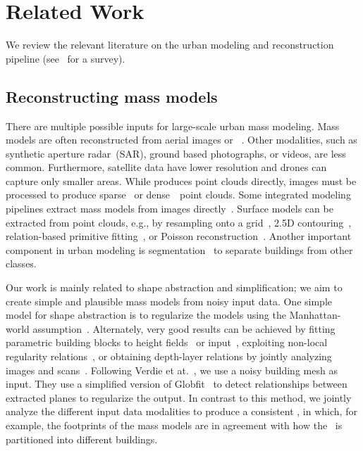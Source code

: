 
\section{Related Work}

We review the relevant literature on the urban modeling and reconstruction pipeline (see~\cite{musialski2013survey} for a  survey).

\subsection{Reconstructing mass models}
There are multiple possible inputs for large-scale urban mass modeling. Mass models are often reconstructed from aerial images or \lidar~\cite{brenner2005building}. Other modalities, such as synthetic aperture radar~(SAR), ground based photographs, or videos, are less common. Furthermore, satellite data have lower resolution and drones can capture only smaller areas.
While \lidar produces point clouds directly, images must be processed to produce sparse~\cite{snavely2006photo} or dense~\cite{furukawa2010accurate,cmzp_symmCalib_tog13}~point clouds. 
Some integrated modeling pipelines extract mass models from images directly~\cite{dick2004modelling,vanegas2010building,garcia2013automatic}. 
Surface models can be extracted from point clouds, e.g.,  by resampling onto a grid~\cite{poullis2009automatic}, 2.5D contouring~\cite{zhou20102}, relation-based primitive fitting~\cite{monszpart2015rapter}, or Poisson reconstruction~\cite{kazhdan2013screened}.
Another important component in urban modeling is segmentation~\cite[e.g.,][]{matei2008building,golovinskiy2009shape,verdie2015lod} to separate buildings from other classes.

Our work is mainly related to shape abstraction and simplification; we aim to create simple and plausible mass models from noisy input data. One simple model for shape abstraction is to regularize the models using the Manhattan-world assumption~\cite{li2016manhattan}. Alternately, very good results can be achieved by fitting parametric building blocks to height fields~\cite{lafarge2010structural} or \lidar input~\cite{lin2013semantic}, exploiting non-local regularity relations~\cite{zheng2010non}, or obtaining depth-layer relations by jointly analyzing images and \lidar scans~\cite{li20112d}. 
Following Verdie et at.~, we use a noisy building mesh as input. They use a simplified version of Globfit~\cite{li2011globfit} to detect relationships between extracted planes to regularize the output. In contrast to this method, we  jointly analyze the different input data modalities to produce a consistent \outputM, in which, for example, the footprints of the mass models are in agreement with how the \streetI\ is partitioned into different buildings. 

